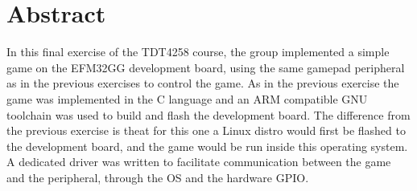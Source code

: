 \chapter*{Abstract}

In this final exercise of the TDT4258 course, the group implemented a simple game on the EFM32GG development board, using the same gamepad peripheral as in the previous exercises to control the game.
As in the previous exercise the game was implemented in the C language and an ARM compatible GNU toolchain was used to build and flash the development board.
The difference from the previous exercise is theat for this one a Linux distro would first be flashed to the development board, and the game would be run inside this operating system.
A dedicated driver was written to facilitate communication between the game and the peripheral, through the OS and the hardware GPIO.
